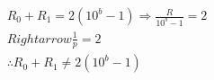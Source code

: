 \documentclass[preview]{standalone}
\begin{document}
\begin{align*}
R_{0}+R_{1}=2(10^b - 1) \Rightarrow \frac{R}{10^b - 1} = 2 \\Rightarrow \frac{1}{p} = 2 \\ \therefore R_{0}+R_{1} \ne 2(10^b - 1)
\end{align*}
\end{document}

